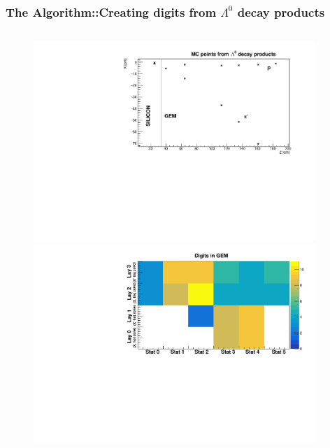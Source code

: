\documentclass[dvipsnames] {beamer}
\begin{document}
       \begin{frame}
         \frametitle{\bf \centering \footnotesize The Algorithm::Creating digits from $\Lambda^{0}$ decay products}       
         \bf
         \vskip -0.75cm
         \begin{columns}[t]
            \begin{block}{}
           \begin{figure}[H]
             \includegraphics[width=1.\linewidth]{EmbeddingMCPoints.pdf}
             \includegraphics[width=1.\linewidth]{EmbeddingGemDigits.pdf}
            \end{figure}
            \end{block}
            \vskip -0.3cm
            \begin{block}{}
              \tiny

\end{block}
\end{columns}
\end{frame}
\end{document}
